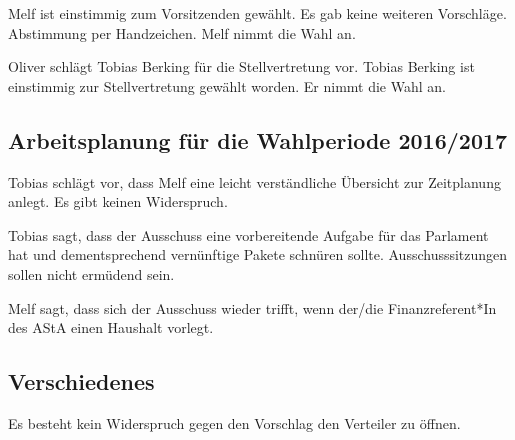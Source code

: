 \documentclass[ngerman,headheight=70pt]{scrartcl}
\begin{document}
    Melf ist einstimmig zum Vorsitzenden gewählt. Es gab
    keine weiteren Vorschläge. Abstimmung per Handzeichen.
    Melf nimmt die Wahl an.

    Oliver schlägt Tobias Berking für die Stellvertretung vor.
    Tobias Berking ist einstimmig zur Stellvertretung gewählt worden.
    Er nimmt die Wahl an.

    \subsection{Arbeitsplanung für die Wahlperiode 2016/2017}

    Tobias schlägt vor, dass Melf eine leicht verständliche Übersicht
    zur Zeitplanung anlegt. Es gibt keinen Widerspruch.

    Tobias sagt, dass der Ausschuss eine vorbereitende Aufgabe für
    das Parlament hat und dementsprechend vernünftige Pakete schnüren
    sollte. Ausschusssitzungen sollen nicht ermüdend sein.

    Melf sagt, dass sich der Ausschuss wieder trifft, wenn der/die
    Finanzreferent*In des AStA einen Haushalt vorlegt.

    \subsection{Verschiedenes}

    Es besteht kein Widerspruch gegen den Vorschlag den Verteiler zu
    öffnen.
\end{document}
